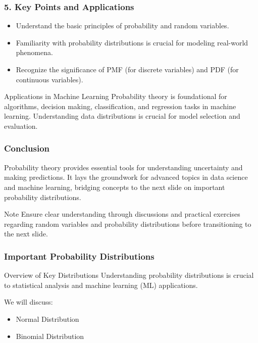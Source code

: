 \documentclass[aspectratio=169]{beamer}
\begin{document}
\begin{frame}[fragile]
    \frametitle{5. Key Points and Applications}
    \begin{itemize}
        \item Understand the basic principles of probability and random variables.
        \item Familiarity with probability distributions is crucial for modeling real-world phenomena.
        \item Recognize the significance of PMF (for discrete variables) and PDF (for continuous variables).
    \end{itemize}
    
    \begin{block}{Applications in Machine Learning}
        Probability theory is foundational for algorithms, decision making, classification, and regression tasks in machine learning. Understanding data distributions is crucial for model selection and evaluation.
    \end{block}
\end{frame}

\begin{frame}[fragile]
    \frametitle{Conclusion}
    Probability theory provides essential tools for understanding uncertainty and making predictions. It lays the groundwork for advanced topics in data science and machine learning, bridging concepts to the next slide on important probability distributions.
    
    \begin{block}{Note}
        Ensure clear understanding through discussions and practical exercises regarding random variables and probability distributions before transitioning to the next slide.
    \end{block}
\end{frame}

\begin{frame}[fragile]
    \frametitle{Important Probability Distributions}
    \begin{block}{Overview of Key Distributions}
        Understanding probability distributions is crucial to statistical analysis and machine learning (ML) applications. 
    \end{block}
    We will discuss:
    \begin{itemize}
        \item Normal Distribution
        \item Binomial Distribution
    \end{itemize}
\end{frame}
\end{document}
